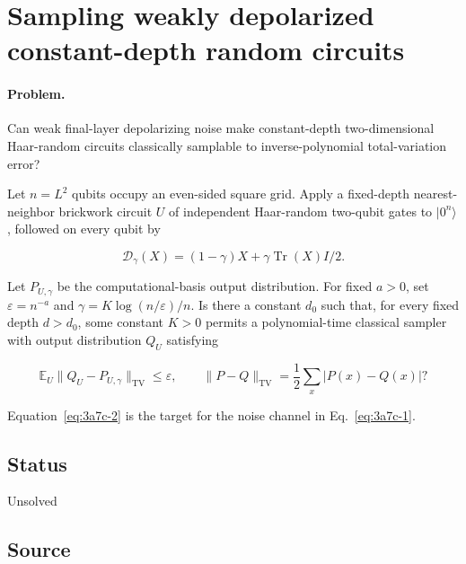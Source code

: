 \section{Sampling weakly depolarized constant-depth random circuits}
\label{sec:op_3a7c93378a832c01}

\paragraph{Problem.}
Can weak final-layer depolarizing noise make constant-depth two-dimensional Haar-random circuits classically samplable to inverse-polynomial total-variation error?

Let $n=L^2$ qubits occupy an even-sided square grid. Apply a fixed-depth nearest-neighbor brickwork circuit $U$ of independent Haar-random two-qubit gates to $|0^n\rangle$, followed on every qubit by

\begin{equation}
\mathcal D_\gamma(X)=(1-\gamma)X+\gamma\operatorname{Tr}(X)I/2.
\label{eq:3a7c-1}
\end{equation}

Let $P_{U,\gamma}$ be the computational-basis output distribution. For fixed $a>0$, set $\varepsilon=n^{-a}$ and $\gamma=K\log(n/\varepsilon)/n$. Is there a constant $d_0$ such that, for every fixed depth $d>d_0$, some constant $K>0$ permits a polynomial-time classical sampler with output distribution $Q_U$ satisfying

\begin{equation}
\mathbb E_U\|Q_U-P_{U,\gamma}\|_{\mathrm{TV}}\leq\varepsilon,
\qquad
\|P-Q\|_{\mathrm{TV}}=\frac12\sum_x|P(x)-Q(x)|?
\label{eq:3a7c-2}
\end{equation}

Equation~\eqref{eq:3a7c-2} is the target for the noise channel in Eq.~\eqref{eq:3a7c-1}.

\subsection*{Status}

Unsolved

\subsection*{Source}

